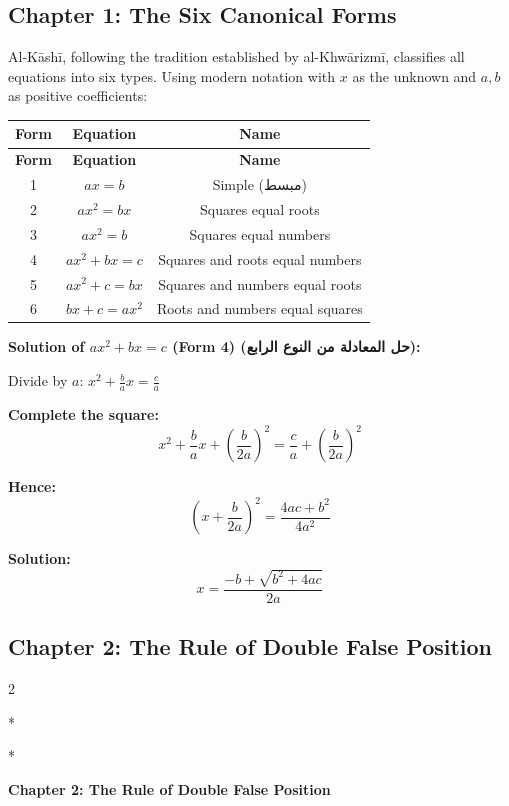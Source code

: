 \documentclass[11pt,a4paper]{article}
\newcommand{\ar}[1]{{\arabicfont\beginR #1\endR}}
\newenvironment{bilingual}{%
  \vspace{0.3em}%
  \begin{paracol}{2}%
}{%
  \end{paracol}%
  \vspace{0.3em}%
}
\newenvironment{mathalgo}{%
  \par\vspace{0.3cm}
  \begin{framed}
  \setlength{\parindent}{0pt}
}{%
  \end{framed}
  \par\vspace{0.3cm}
}
\begin{document}
\subsection{Chapter 1: The Six Canonical Forms}

Al-K\=ash\=i, following the tradition established by al-Khw\=arizm\=i,
classifies all equations into six types. Using modern notation with $x$
as the unknown and $a, b$ as positive coefficients:

\begin{longtable}{|c|c|c|}
\hline
\textbf{Form} & \textbf{Equation} & \textbf{Name} \\
\hline
\endfirsthead
\hline
\textbf{Form} & \textbf{Equation} & \textbf{Name} \\
\hline
\endhead
1 & $ax = b$ & Simple (\ar{مبسط}) \\
\hline
2 & $ax^2 = bx$ & Squares equal roots \\
\hline
3 & $ax^2 = b$ & Squares equal numbers \\
\hline
4 & $ax^2 + bx = c$ & Squares and roots equal numbers \\
\hline
5 & $ax^2 + c = bx$ & Squares and numbers equal roots \\
\hline
6 & $bx + c = ax^2$ & Roots and numbers equal squares \\
\hline
\end{longtable}

\begin{mathalgo}
\textbf{Solution of $ax^2 + bx = c$ (Form 4) (\ar{حل المعادلة من النوع الرابع}):}

Divide by $a$: $x^2 + \frac{b}{a}x = \frac{c}{a}$

\textbf{Complete the square:}
\[
x^2 + \frac{b}{a}x + \left(\frac{b}{2a}\right)^2 = \frac{c}{a} +
\left(\frac{b}{2a}\right)^2
\]

\textbf{Hence:}
\[
\left(x + \frac{b}{2a}\right)^2 = \frac{4ac + b^2}{4a^2}
\]

\textbf{Solution:}
\[
x = \frac{-b + \sqrt{b^2 + 4ac}}{2a}
\]
\end{mathalgo}

\subsection{Chapter 2: The Rule of Double False Position}

\begin{bilingual}
\switchcolumn[0]*
\begin{center}
\textbf{\color{chapcolor}\ar{فصل في استخراج المجهول بطريقة الخطأين}}
\end{center}
\switchcolumn[1]*
\begin{center}
\textbf{\color{chapcolor}Chapter 2: The Rule of Double False Position}
\end{center}
\end{bilingual}
\end{document}
